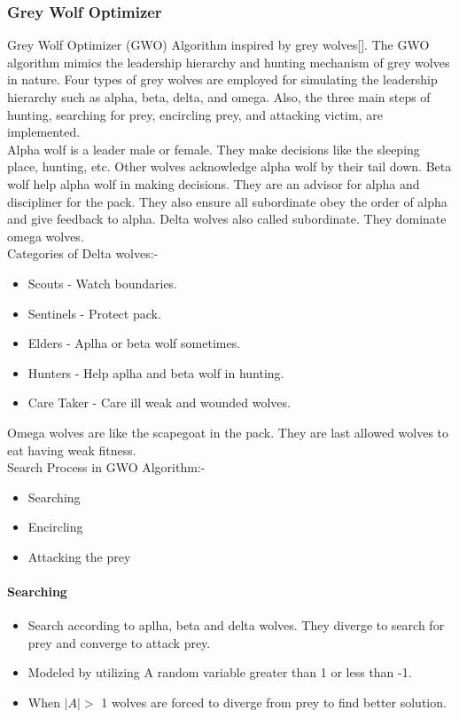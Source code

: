 \documentclass[12pt,a4paper]{article}
\begin{document}
\subsubsection{Grey Wolf Optimizer}
Grey Wolf Optimizer (GWO) Algorithm inspired by grey wolves[]. The GWO algorithm mimics the leadership hierarchy and hunting mechanism of grey wolves in nature. Four types of grey wolves are employed for simulating the leadership hierarchy such as alpha, beta, delta, and omega. Also, the three main steps of hunting, searching for prey, encircling prey, and attacking victim, are implemented.\\
Alpha wolf is a leader male or female. They make decisions like the sleeping place, hunting, etc. Other wolves acknowledge alpha wolf by their tail down. Beta wolf help alpha wolf in making decisions. They are an advisor for alpha and discipliner for the pack. They also ensure all subordinate obey the order of alpha and give feedback to alpha. Delta wolves also called subordinate. They dominate omega wolves.\\
Categories of Delta wolves:-
\begin{itemize}
    \item Scouts - Watch boundaries.
    \item Sentinels - Protect pack.
    \item Elders - Aplha or beta wolf sometimes.
    \item Hunters - Help aplha and beta wolf in hunting.
    \item Care Taker - Care ill weak and wounded wolves.
\end{itemize}
Omega wolves are like the scapegoat in the pack. They are last allowed wolves to eat having weak fitness.\\
Search Process in GWO Algorithm:-
\begin{itemize}
    \item Searching
    \item Encircling
    \item Attacking the prey
\end{itemize}

\paragraph{Searching}
\begin{itemize}
    \item Search according to aplha, beta and delta wolves. They diverge to search for prey and converge to attack prey.
    \item Modeled by utilizing A random variable greater than 1 or less than -1.
    \item When $|A| >$ 1 wolves are forced to diverge from prey to find better solution.
\end{itemize}
\end{document}
